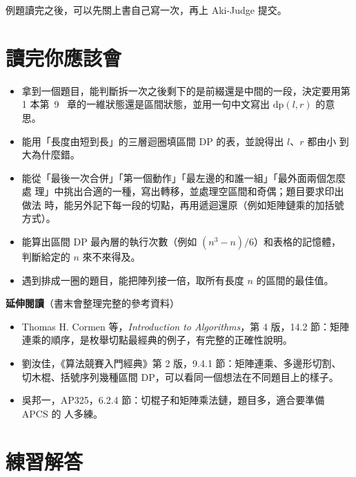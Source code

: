 例題讀完之後，可以先關上書自己寫一次，再上 Aki-Judge 提交。

\section{讀完你應該會}
\label{sec:ivdp-checklist}

\begin{itemize}
\item 拿到一個題目，能判斷拆一次之後剩下的是前綴還是中間的一段，決定要用第 1 本第~9~
章的一維狀態還是區間狀態，並用一句中文寫出 $\mathrm{dp}(l, r)$ 的意思。
\item 能用「長度由短到長」的三層迴圈填區間 DP 的表，並說得出 $l$、$r$ 都由小
到大為什麼錯。
\item 能從「最後一次合併」「第一個動作」「最左邊的和誰一組」「最外面兩個怎麼處
理」中挑出合適的一種，寫出轉移，並處理空區間和奇偶；題目要求印出做法
時，能另外記下每一段的切點，再用遞迴還原（例如矩陣鏈乘的加括號方式）。
\item 能算出區間 DP 最內層的執行次數（例如 $(n^3 - n)/6$）和表格的記憶體，
判斷給定的 $n$ 來不來得及。
\item 遇到排成一圈的題目，能把陣列接一倍，取所有長度 $n$ 的區間的最佳值。
\end{itemize}

\textbf{延伸閱讀}（書末會整理完整的參考資料）

\begin{itemize}
\item Thomas H. Cormen 等，\textit{Introduction to Algorithms}，第 4 版，14.2
節：矩陣連乘的順序，是枚舉切點最經典的例子，有完整的正確性說明。
\item 劉汝佳，《算法競賽入門經典》第 2 版，9.4.1 節：矩陣連乘、多邊形切割、
切木棍、括號序列幾種區間 DP，可以看同一個想法在不同題目上的樣子。
\item 吳邦一，AP325，6.2.4 節：切棍子和矩陣乘法鏈，題目多，適合要準備 APCS 的
人多練。
\end{itemize}

\section*{練習解答}

